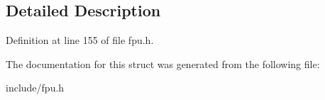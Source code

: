 \subsection{Detailed Description}


Definition at line 155 of file fpu.\-h.



The documentation for this struct was generated from the following file\-:\begin{DoxyCompactItemize}
\item 
include/fpu.\-h\end{DoxyCompactItemize}
